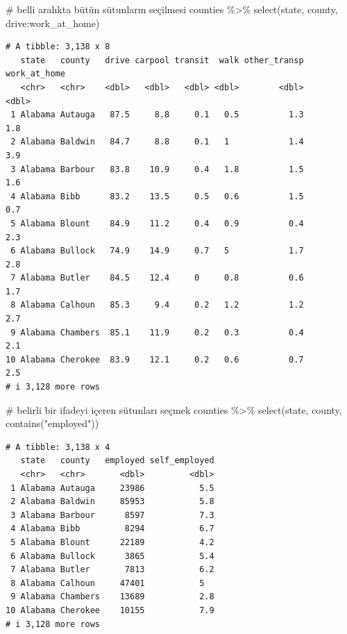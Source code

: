 \documentclass[
  letterpaper,
  DIV=11,
  numbers=noendperiod]{scrreprt}
\newenvironment{Shaded}{\begin{snugshade}}{\end{snugshade}}
\newcommand{\CommentTok}[1]{\textcolor[rgb]{0.37,0.37,0.37}{#1}}
\newcommand{\FunctionTok}[1]{\textcolor[rgb]{0.28,0.35,0.67}{#1}}
\newcommand{\NormalTok}[1]{\textcolor[rgb]{0.00,0.23,0.31}{#1}}
\newcommand{\SpecialCharTok}[1]{\textcolor[rgb]{0.37,0.37,0.37}{#1}}
\newcommand{\StringTok}[1]{\textcolor[rgb]{0.13,0.47,0.30}{#1}}
\begin{document}
\begin{Shaded}
\begin{Highlighting}[]
\CommentTok{\# belli aralıkta bütün sütunların seçilmesi}
\NormalTok{counties }\SpecialCharTok{\%\textgreater{}\%}
\FunctionTok{select}\NormalTok{(state, county, drive}\SpecialCharTok{:}\NormalTok{work\_at\_home)}
\end{Highlighting}
\end{Shaded}

\begin{verbatim}
# A tibble: 3,138 x 8
   state   county   drive carpool transit  walk other_transp work_at_home
   <chr>   <chr>    <dbl>   <dbl>   <dbl> <dbl>        <dbl>        <dbl>
 1 Alabama Autauga   87.5     8.8     0.1   0.5          1.3          1.8
 2 Alabama Baldwin   84.7     8.8     0.1   1            1.4          3.9
 3 Alabama Barbour   83.8    10.9     0.4   1.8          1.5          1.6
 4 Alabama Bibb      83.2    13.5     0.5   0.6          1.5          0.7
 5 Alabama Blount    84.9    11.2     0.4   0.9          0.4          2.3
 6 Alabama Bullock   74.9    14.9     0.7   5            1.7          2.8
 7 Alabama Butler    84.5    12.4     0     0.8          0.6          1.7
 8 Alabama Calhoun   85.3     9.4     0.2   1.2          1.2          2.7
 9 Alabama Chambers  85.1    11.9     0.2   0.3          0.4          2.1
10 Alabama Cherokee  83.9    12.1     0.2   0.6          0.7          2.5
# i 3,128 more rows
\end{verbatim}

\begin{Shaded}
\begin{Highlighting}[]
\CommentTok{\# belirli bir ifadeyi içeren sütunları seçmek}
\NormalTok{counties }\SpecialCharTok{\%\textgreater{}\%}
\FunctionTok{select}\NormalTok{(state, county, }\FunctionTok{contains}\NormalTok{(}\StringTok{"employed"}\NormalTok{))}
\end{Highlighting}
\end{Shaded}

\begin{verbatim}
# A tibble: 3,138 x 4
   state   county   employed self_employed
   <chr>   <chr>       <dbl>         <dbl>
 1 Alabama Autauga     23986           5.5
 2 Alabama Baldwin     85953           5.8
 3 Alabama Barbour      8597           7.3
 4 Alabama Bibb         8294           6.7
 5 Alabama Blount      22189           4.2
 6 Alabama Bullock      3865           5.4
 7 Alabama Butler       7813           6.2
 8 Alabama Calhoun     47401           5  
 9 Alabama Chambers    13689           2.8
10 Alabama Cherokee    10155           7.9
# i 3,128 more rows
\end{verbatim}
\end{document}

